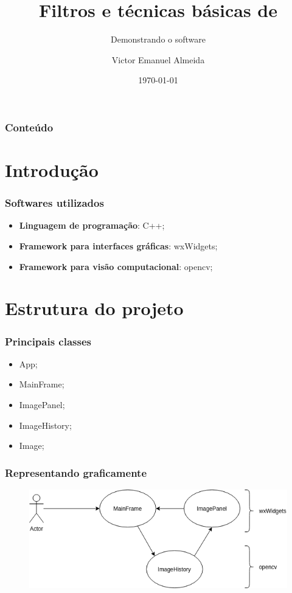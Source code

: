 \documentclass[12pt]{beamer}
\author[Aluno:~Victor E. Almeida]{Victor Emanuel Almeida}
\title{Filtros e técnicas básicas de \materia}
\subtitle{Demonstrando o software}
\date{\today}
\institute{UNIOESTE}
\begin{document}
\frame{\titlepage}

\begin{frame}
\frametitle{Conteúdo}
\tableofcontents
\end{frame}

\section{Introdução}\label{Introdução}
\begin{frame}
    \frametitle{Softwares utilizados}
    \begin{itemize}
    \item\textbf{Linguagem de programação}: C++;
    \item\textbf{Framework para interfaces gráficas}: wxWidgets\cite{docsWx};
    \item\textbf{Framework para visão computacional}: opencv\cite{docsCv};
    \end{itemize}
\end{frame}

\section{Estrutura do projeto}\label{Estrutura do projeto}
\begin{frame}
    \frametitle{Principais classes}
    \begin{itemize}
        \item App;
        \item MainFrame;
        \item ImagePanel;
        \item ImageHistory;
        \item Image;
    \end{itemize}
\end{frame}

\begin{frame}
    \frametitle{Representando graficamente}

    \begin{figure}
        \includegraphics[width=.9\linewidth]{flow.png}
    \end{figure}

\end{frame}
\end{document}
